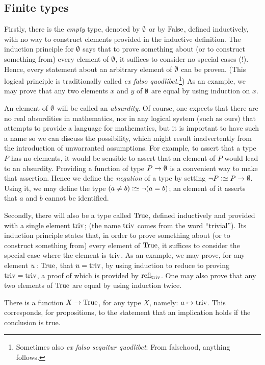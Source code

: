 \subsection{Finite types}
\label{sec:finite-types}
Firstly, there is the \emph{empty} type, denoted by $\emptyset$ or by $\mathrm{False}$, defined inductively, with no way to construct elements provided in the inductive
definition.  The induction principle for $\emptyset$ says that to prove something about (or to construct something from) every element of
$\emptyset$, it suffices to consider no special cases (!).  Hence, every statement about an arbitrary element of $\emptyset$ can be proven. (This logical principle is traditionally called \emph{ex falso quodlibet}.\footnote{%
  Sometimes also \emph{ex falso sequitur quodlibet}:
  From falsehood, anything follows.}) As
an example, we may prove that any two elements $x$ and $y$ of $\emptyset$ are equal by using induction on $x$.

An element of $\emptyset$ will be called an \emph{absurdity}.  Of course, one expects that there are no real absurdities in mathematics, nor in any
logical system (such as ours) that attempts to provide a language for mathematics, but it is important to have such a name so we can discuss
the possibility, which might result inadvertently from the introduction of unwarranted assumptions.  For example, to assert that a type $P$ has
no elements, it would be sensible to assert that an element of $P$ would lead to an absurdity.  Providing a function of type $P \to \emptyset$ is a
convenient way to make that assertion.  Hence we define the \emph{negation} of a type by setting $\neg P \defeq P \to \emptytype$.  Using it, we
may define the type $(a \ne b) \defeq \neg (a = b)$; an element of it asserts that $a$ and $b$ cannot be identified.

Secondly, there will also be a type called $\mathrm{True}$, defined inductively and provided with a single element $\mathrm{triv}$; (the name $\mathrm{triv}$ comes from the word
  ``trivial'').  Its induction principle
states that, in order to prove something about (or to construct something from) every element of $\mathrm{True}$, it suffices to consider the special
case where the element is $\mathrm{triv}$.  As an example, we may prove, for any element $u : \mathrm{True}$, that $u=\mathrm{triv}$, by using induction to reduce
to proving $\mathrm{triv}=\mathrm{triv}$, a proof of which is provided by $\mathrm{refl}_{\mathrm{triv}}$.  One may also prove that any two elements of $\mathrm{True}$ are equal by using induction twice.

There is a function $X \to \mathrm{True}$, for any type $X$, namely: $a \mapsto \mathrm{triv}$.  This corresponds, for propositions, to the statement that an
implication holds if the conclusion is true.

